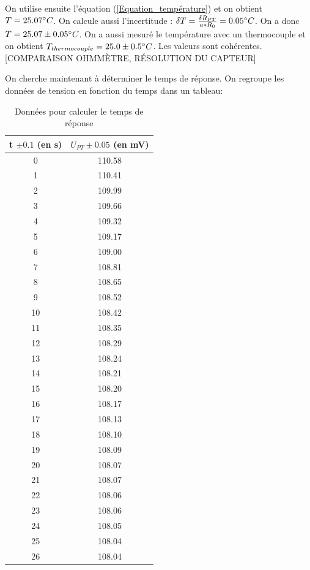 \documentclass[12pt]{article}
\begin{document}
On utilise ensuite l'équation (\ref{Equation_température}) et on obtient $T=25.07 \degree C$. On calcule aussi l'incertitude : $\delta T = \frac{\delta R_{PT}}{a*R_0}=0.05 \degree C$. On a donc $T=25.07\pm 0.05 \degree C$. On a aussi mesuré le température avec un thermocouple et on obtient $T_{thermocouple}=25.0\pm 0.5 \degree C$. Les valeurs sont cohérentes. 
[COMPARAISON OHMMÈTRE, RÉSOLUTION DU CAPTEUR]

\newpage
On cherche maintenant à déterminer le temps de réponse. On regroupe les données de tension en fonction du temps dans un tableau:
\begin{table}[!h]
	\begin{center}
		\begin{tabular}{|c|c|}
\hline
 t $\pm 0.1$ (en s) &  $U_{PT}\pm 0.05$ (en mV) \\
\hline
        0 &        110.58 \\
        1 &        110.41 \\
        2 &        109.99 \\
        3 &        109.66 \\
        4 &        109.32 \\
        5 &        109.17 \\
        6 &        109.00 \\
        7 &        108.81 \\
        8 &        108.65 \\
        9 &        108.52 \\
       10 &        108.42 \\
       11 &        108.35 \\
       12 &        108.29 \\
       13 &        108.24 \\
       14 &        108.21 \\
       15 &        108.20 \\
       16 &        108.17 \\
       17 &        108.13 \\
       18 &        108.10 \\
       19 &        108.09 \\
       20 &        108.07 \\
       21 &        108.07 \\
       22 &        108.06 \\
       23 &        108.06 \\
       24 &        108.05 \\
       25 &        108.04 \\
       26 &        108.04 \\
\hline
\end{tabular}
	\end{center}
	\label{Tableau_Data}
	\caption{Données pour calculer le temps de réponse}
\end{table}
\end{document}
